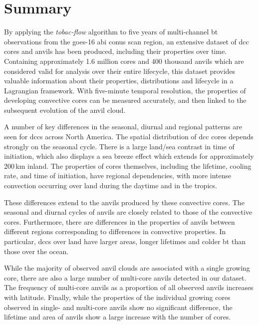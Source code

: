 \section{Summary}  %

By applying the \textit{tobac-flow} algorithm to five years of multi-channel \acrshort{bt} observations from the \acrshort{goes}-16 \acrshort{abi} \acrshort{conus} scan region, an extensive dataset of \acrshort{dcc} cores and anvils has been produced, including their properties over time.
Containing approximately 1.6 million cores and 400 thousand anvils which are considered valid for analysis over their entire lifecycle, this dataset provides valuable information about their properties, distributions and lifecycle in a Lagrangian framework.
With five-minute temporal resolution, the properties of developing convective cores can be measured accurately, and then linked to the subsequent evolution of the anvil cloud.

A number of key differences in the seasonal, diurnal and regional patterns are seen for \acrshort{dcc}s across North America.
The spatial distribution of \acrshort{dcc} cores depends strongly on the seasonal cycle.
There is a large land/sea contrast in time of initiation, which also displays a sea breeze effect which extends for approximately 200\,\unit{km} inland.
The properties of cores themselves, including the lifetime, cooling rate, and time of initiation, have regional dependencies, with more intense convection occurring over land during the daytime and in the tropics.

These differences extend to the anvils produced by these convective cores.
The seasonal and diurnal cycles of anvils are closely related to those of the convective cores.
Furthermore, there are differences in the properties of anvils between different regions corresponding to differences in convective properties.
In particular, \acrshort{dcc}s over land have larger areas, longer lifetimes and colder \acrshort{bt} than those over the ocean.

While the majority of observed anvil clouds are associated with a single growing core, there are also a large number of multi-core anvils detected in our dataset.
The frequency of multi-core anvils as a proportion of all observed anvils increases with latitude.
Finally, while the properties of the individual growing cores observed in single- and multi-core anvils show no significant difference, the lifetime and area of anvils show a large increase with the number of cores.


